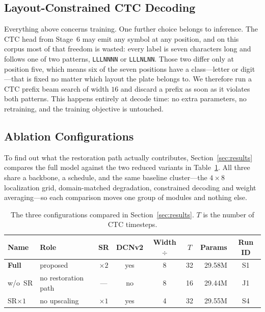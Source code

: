 \documentclass[runningheads]{llncs}
\begin{document}

\subsection{Layout-Constrained CTC Decoding}

Everything above concerns training. One further choice belongs to inference. The CTC head from Stage~6 may emit any symbol at any position, and on this corpus most of that freedom is wasted: every label is seven characters long and follows one of two patterns, \texttt{LLLNNNN} or \texttt{LLLNLNN}. Those two differ only at position five, which means six of the seven positions have a class---letter or digit---that is fixed no matter which layout the plate belongs to. We therefore run a CTC prefix beam search of width $16$ and discard a prefix as soon as it violates both patterns. This happens entirely at decode time: no extra parameters, no retraining, and the training objective is untouched.


\subsection{Ablation Configurations}
\label{sec:configs}

To find out what the restoration path actually contributes, Section~\ref{sec:results} compares the full model against the two reduced variants in Table~\ref{tab:configs}. All three share a backbone, a schedule, and the same baseline cluster---the $4 \times 8$ localization grid, domain-matched degradation, constrained decoding and weight averaging---so each comparison moves one group of modules and nothing else.

\begin{table}[!ht]
\centering
\caption{The three configurations compared in Section~\ref{sec:results}. $T$ is the number of CTC timesteps.}
\label{tab:configs}
\begin{tabular}{llccccrc}
\hline
Name & Role & SR & DCNv2 & Width $\div$ & $T$ & Params & Run ID \\
\hline
\textbf{Full} & proposed & $\times 2$ & yes & 8 & 32 & 29.58M & S1 \\
w/o~SR & no restoration path & --- & no & 8 & 16 & 29.44M & J1 \\
SR$\times 1$ & no upscaling & $\times 1$ & yes & 4 & 32 & 29.55M & S4 \\
\hline
\end{tabular}
\end{table}
\end{document}
